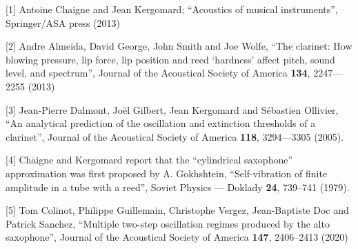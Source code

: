   \sectionreferences{}[1] Antoine Chaigne and Jean Kergomard; “Acoustics of 
  musical instruments”, Springer/ASA press (2013) 

  [2] Andre Almeida, David George, John Smith and Joe Wolfe, “The clarinet: How 
  blowing pressure, lip force, lip position and reed ‘hardness’ affect pitch, 
  sound level, and spectrum”, Journal of the Acoustical Society of America 
  \textbf{134}, 2247—2255 (2013) 

  [3] Jean-Pierre Dalmont, Joël Gilbert, Jean Kergomard and Sébastien Ollivier, 
  “An analytical prediction of the oscillation and extinction thresholds of a 
  clarinet”, Journal of the Acoustical Society of America \textbf{118}, 
  3294—3305 (2005). 

  [4] Chaigne and Kergomard report that the ``cylindrical saxophone'' 
  approximation was first proposed by A. Gokhshtein, ``Self-vibration of finite 
  amplitude in a tube with a reed'', Soviet Physics --- Doklady \textbf{24}, 
  739--741 (1979). 

  [5] Tom Colinot, Philippe Guillemain, Christophe Vergez, Jean-Baptiste Doc 
  and Patrick Sanchez, “Multiple two-step oscillation regimes produced by the 
  alto saxophone”, Journal of the Acoustical Society of America \textbf{147}, 
  2406–2413 (2020) 